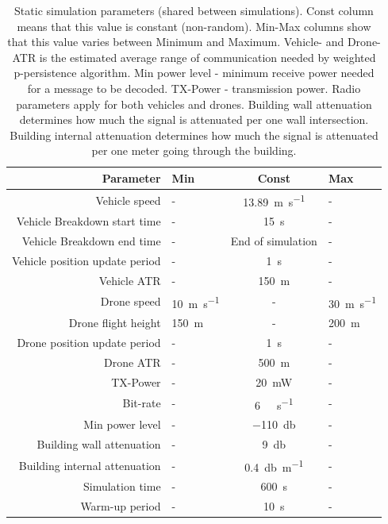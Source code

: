 \documentclass[]{nsm-thesis}
\begin{document}
\begin{table}
    \centering
    \begin{tabular}{rlcl}
        \toprule
        Parameter & Min & Const & Max \\
        \midrule
		Vehicle speed & - & \SI{13.89}{\meter\per\second} & - \\
		Vehicle Breakdown start time & - & \SI{15}{\second} & - \\
		Vehicle Breakdown end time & - & End of simulation & - \\
		Vehicle position update period & - & \SI{1}{\second} & - \\
		Vehicle \ac{ATR} & - & \SI{150}{\meter} & - \\
		\hline
        	Drone speed & \SI{10}{\meter\per\second} & - & \SI{30}{\meter\per\second} \\
        	Drone flight height & \SI{150}{\meter} & - & \SI{200}{\meter} \\
		Drone position update period & - & \SI{1}{\second} & - \\
		Drone \ac{ATR} & - & \SI{500}{\meter} & - \\
		\hline
		TX-Power & - & \SI{20}{\milli\watt} & - \\
		Bit-rate & - & \SI{6}{\mega\bit\per\second} & - \\
		Min power level  & - & \SI{-110}{\decibel} & - \\
		\hline
		Building wall attenuation  & - & \SI{9}{\decibel} & - \\
		Building internal attenuation & - & \SI{0.4}{\decibel\per\meter} & - \\
		\hline
		Simulation time & - & \SI{600}{\second} & - \\
		Warm-up period & - & \SI{10}{\second} & - \\
		
        \bottomrule
    \end{tabular}
    \caption{Static simulation parameters (shared between simulations). Const column means that this value is constant (non-random). Min-Max columns show that this value varies between Minimum and Maximum. Vehicle- and Drone- \ac{ATR} is the estimated average range of communication needed by weighted p-persistence algorithm. Min power level - minimum receive power needed for a message to be decoded. TX-Power - transmission power. Radio parameters apply for both vehicles and drones. Building wall attenuation determines how much the signal is attenuated per one wall intersection. Building internal attenuation determines how much the signal is attenuated per one meter going through the building.}
    \label{tab:simulationparams}
\end{table}
\end{document}

